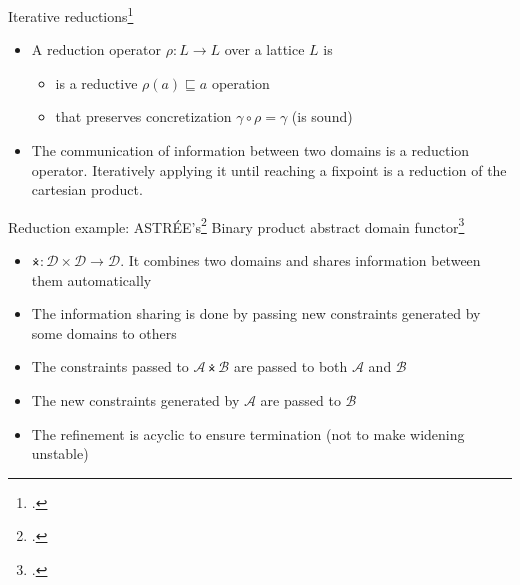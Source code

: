 \documentclass[aspectratio=169]{beamer}
\begin{document}
\begin{frame}{Iterative reductions\footcite{cousot2011reduced}}
  \small
  \begin{tightcenter}
  \end{tightcenter}
  \begin{itemize}
  \item A reduction operator $\rho: L \to L$ over a lattice $L$ is
    \begin{itemize}
    \item<2-> is a reductive $\rho(a) \sqsubseteq a$ operation
    \item<3-> that preserves concretization $\gamma \circ \rho = \gamma$ (is sound)
    \end{itemize}
  \item<4-> The communication of information between two domains is a reduction operator. Iteratively applying it until reaching a fixpoint is a reduction of the cartesian product.
  \end{itemize}
\end{frame}

\begin{frame}{Reduction example: ASTRÉE's\footcite{cousot2005astree} Binary product abstract domain functor\footcite{cousot2006combination}}
  \begin{itemize}[<+->]
  \item $\dottimes : \mathcal{D \times D} \to \mathcal{D}$. It combines two domains and shares information between them automatically
  \item The information sharing is done by passing new constraints generated by some domains to others
  \item The constraints passed to $\mathcal{A \dottimes B}$ are passed to both $\mathcal{A}$ and $\mathcal{B}$
  \item The new constraints generated by $\mathcal{A}$ are passed to $\mathcal{B}$
  \item The refinement is acyclic to ensure termination (not to make widening unstable)
  \end{itemize}
\end{frame}
\end{document}
